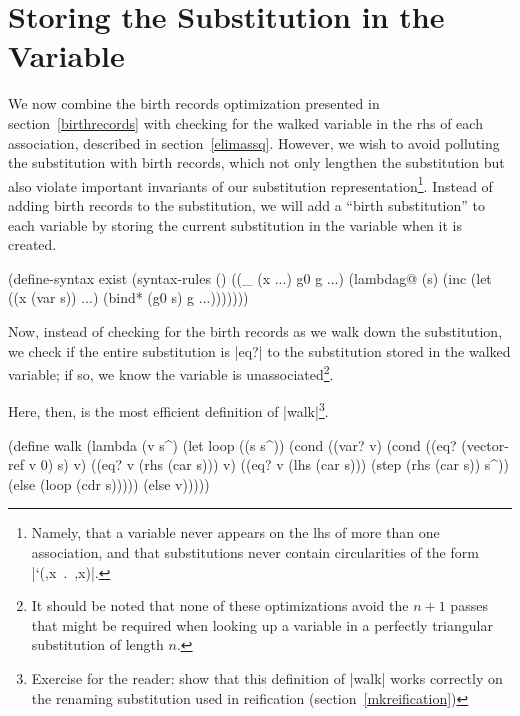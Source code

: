 \section{Storing the Substitution in the Variable}\label{storesubst}

We now combine the birth records optimization presented in
section~\ref{birthrecords} with checking for the walked variable in
the rhs of each association, described in section~\ref{elimassq}.
However, we wish to avoid polluting the substitution with birth
records, which not only lengthen the substitution but also violate
important invariants of our substitution
representation\footnote{Namely, that a variable never appears on the
  lhs of more than one association, and that substitutions never
  contain circularities of the form \mbox{\scheme|`(,x . ,x)|}.}.
Instead of adding birth records to the substitution, we will add a
``birth substitution'' to each variable by storing the current
substitution in the variable when it is created.

\schemedisplayspace
\begin{schemedisplay}
(define-syntax exist
  (syntax-rules ()
    ((_ (x ...) g0 g ...)
     (lambdag@ (s)
       (inc
         (let ((x (var s)) ...)
           (bind* (g0 s) g ...)))))))
\end{schemedisplay}

Now, instead of checking for the birth records as we walk down the
substitution, we check if the entire substitution is
\mbox{\scheme|eq?|} to the substitution stored in the walked variable;
if so, we know the variable is unassociated\footnote{It should be
  noted that none of these optimizations avoid the $n+1$ passes that
  might be required when looking up a variable in a perfectly
  triangular substitution of length $n$.}.

\newpage

Here, then, is the most efficient definition of
\mbox{\scheme|walk|}\footnote{Exercise for the reader: show that this
  definition of \mbox{\scheme|walk|} works correctly on the renaming
  substitution used in reification (section~\ref{mkreification})}.

\schemedisplayspace
\begin{schemedisplay}
(define walk
  (lambda (v s^)
    (let loop ((s s^))
      (cond
        ((var? v)
         (cond
           ((eq? (vector-ref v 0) s) v)
           ((eq? v (rhs (car s))) v)
           ((eq? v (lhs (car s))) (step (rhs (car s)) s^))
           (else (loop (cdr s)))))
        (else v)))))
\end{schemedisplay}

